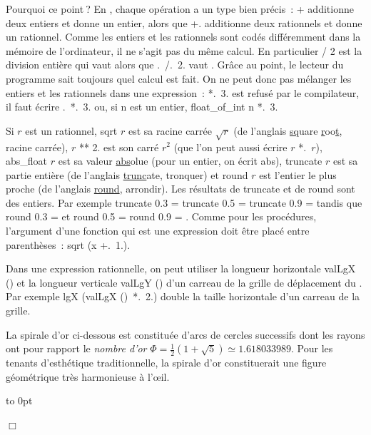 Pourquoi ce point$\:$? En \ocaml, chaque opération a un type bien précis~: {\idt +}
additionne deux entiers et donne un entier, alors que {\idt +.} additionne deux rationnels et
donne un rationnel. Comme les entiers et les rationnels sont codés différemment dans la mémoire
de l'ordinateur, il ne s'agit pas du même calcul. En particulier { / 2} est la division
entière qui vaut {} alors que {.\ /.\ 2.} vaut {}. Grâce au point, le
lecteur du programme sait toujours quel calcul est fait. On ne peut donc pas mélanger les
entiers et les rationnels dans une expression~: { *.\ 3.} est refusé par le
compilateur, il faut écrire {.\ *.\ 3.} ou, si {\idt n} est un entier,
{\idt float\_of\_int n *.\ 3.}

Si $r$ est un rationnel, {\idt sqrt $r$} est sa racine carrée $\sqrt{r}$ (de l'anglais
\underline{sq}uare \underline{r}oo\underline{t}, racine carrée),
{\idt $r$ ** 2.} est son carré $r^{2}$ (que l'on peut aussi écrire {\idt $r$ *.\ $r$}),
{\idt abs\_float $r$} est sa valeur \underline{abs}olue (pour un entier, on écrit
{\idt abs}), {\idt truncate $r$} est sa partie entière (de l'anglais
\underline{trunc}ate, tronquer) et {\idt round $r$} est l'entier le plus proche (de
l'anglais \underline{round}, arrondir). Les résultats de {\idt truncate} et de {\idt round}
sont des entiers. Par exemple
{\idt truncate 0.3} = {\idt truncate 0.5} = {\idt truncate 0.9} = {} tandis que
{\idt round 0.3} = {} et {\idt round 0.5} = {\idt round 0.9} = {}.
Comme pour les procédures, l'argument d'une fonction qui est une expression doit être
placé entre parenthèses~: {\idt sqrt (x +.\ 1.)}.

Dans une expression rationnelle, on peut utiliser la longueur horizontale {\idt valLgX ()} et la
longueur verticale {\idt valLgY ()} d'un carreau de la grille de déplacement du \robot. Par exemple
{\idt lgX (valLgX ()\ *.\ 2.)} double la taille horizontale d'un carreau de la grille.

\begin{exemple}[Spirale d'or]{\rm
La spirale d'or ci-dessous est constituée d'arcs de cercles successifs dont les rayons
ont pour rapport le {\em nombre d'or\/}
$\Phi = \frac{1}{2}(1 + \sqrt{5}) \simeq 1.618033989$. Pour les tenants d'esthétique
traditionnelle, la spirale d'or constituerait une figure géométrique très harmonieuse
à l'œil.

{\raggedright
 \vbox to 0pt{}
 
 }
\noindent $\Box$ }\end{exemple}

